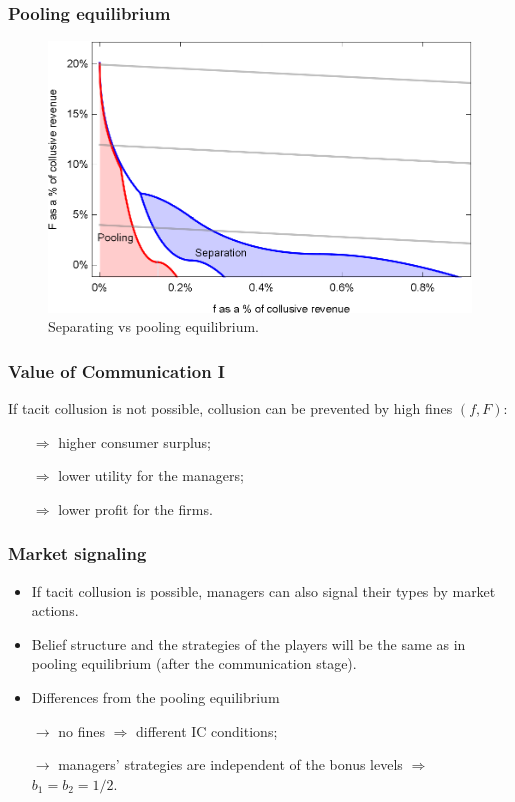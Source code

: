 \documentclass[xcolor=dvipsnames]{beamer}
\begin{document}
\begin{frame}
\frametitle{Pooling equilibrium}
\begin{figure}
\centering
\includegraphics[scale=0.7]{Plots/com_f_F_lines_Sep_pool_woe.eps}
\caption{Separating vs pooling equilibrium.}\label{fig:fines_pool_sep}
\end{figure}
\end{frame}

\begin{frame}
	\frametitle{Value of Communication I}
	If tacit collusion is not possible, collusion can be prevented by high fines $(f,F)$:
	\begin{itemize}
		\item[$\Rightarrow$] higher consumer surplus;
		
		\item[$\Rightarrow$] lower utility for the managers;
		
		\item[$\Rightarrow$] lower profit for the firms.
	\end{itemize}
\end{frame}

\begin{frame}
\frametitle{Market signaling}
\begin{itemize}
\item If tacit collusion is possible, managers can also signal their types by market actions.

\item Belief structure and the strategies of the players will be the same as in pooling equilibrium (after the communication stage).

\item Differences from the pooling equilibrium

\item[] $\rightarrow$ no fines $\Rightarrow$ different IC conditions;

\item[] $\rightarrow$ managers' strategies are independent of the bonus levels $\Rightarrow$ $b_1=b_2=1/2$.
\end{itemize}
\end{frame}
\end{document}
